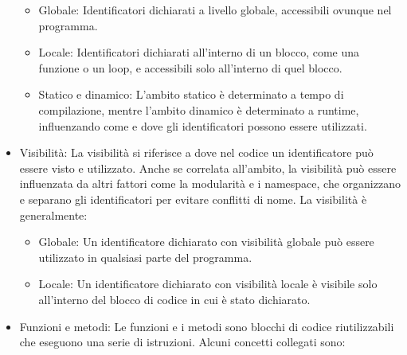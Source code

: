\documentclass[
  letterpaper,
]{scrbook}
\providecommand{\tightlist}{%
  \setlength{\itemsep}{0pt}\setlength{\parskip}{0pt}}\usepackage{longtable,booktabs,array}
\begin{document}
\begin{itemize}
  \begin{itemize}
  \tightlist
  \item
    Globale: Identificatori dichiarati a livello globale, accessibili
    ovunque nel programma.
  \item
    Locale: Identificatori dichiarati all'interno di un blocco, come una
    funzione o un loop, e accessibili solo all'interno di quel blocco.
  \item
    Statico e dinamico: L'ambito statico è determinato a tempo di
    compilazione, mentre l'ambito dinamico è determinato a runtime,
    influenzando come e dove gli identificatori possono essere
    utilizzati.
  \end{itemize}
\item
  Visibilità: La visibilità si riferisce a dove nel codice un
  identificatore può essere visto e utilizzato. Anche se correlata
  all'ambito, la visibilità può essere influenzata da altri fattori come
  la modularità e i namespace, che organizzano e separano gli
  identificatori per evitare conflitti di nome. La visibilità è
  generalmente:

  \begin{itemize}
  \tightlist
  \item
    Globale: Un identificatore dichiarato con visibilità globale può
    essere utilizzato in qualsiasi parte del programma.
  \item
    Locale: Un identificatore dichiarato con visibilità locale è
    visibile solo all'interno del blocco di codice in cui è stato
    dichiarato.
  \end{itemize}
\item
  Funzioni e metodi: Le funzioni e i metodi sono blocchi di codice
  riutilizzabili che eseguono una serie di istruzioni. Alcuni concetti
  collegati sono:


\end{itemize}
\end{document}
